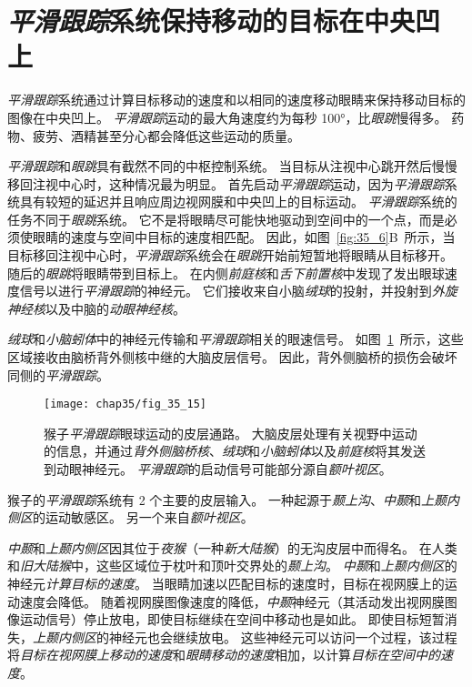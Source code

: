 \section{\textit{平滑跟踪}系统保持移动的目标在中央凹上}

\textit{平滑跟踪}系统通过计算目标移动的速度和以相同的速度移动眼睛来保持移动目标的图像在中央凹上。
\textit{平滑跟踪}运动的最大角速度约为每秒 100°，比\textit{眼跳}慢得多。
药物、疲劳、酒精甚至分心都会降低这些运动的质量。


\textit{平滑跟踪}和\textit{眼跳}具有截然不同的中枢控制系统。
当目标从注视中心跳开然后慢慢移回注视中心时，这种情况最为明显。
首先启动\textit{平滑跟踪}运动，因为\textit{平滑跟踪}系统具有较短的延迟并且响应周边视网膜和中央凹上的目标运动。
\textit{平滑跟踪}系统的任务不同于\textit{眼跳}系统。
它不是将眼睛尽可能快地驱动到空间中的一个点，而是必须使眼睛的速度与空间中目标的速度相匹配。
因此，如图~\ref{fig:35_6}B~所示，当目标移回注视中心时，\textit{平滑跟踪}系统会在\textit{眼跳}开始前短暂地将眼睛从目标移开。
随后的\textit{眼跳}将眼睛带到目标上。
在内侧\textit{前庭核}和\textit{舌下前置核}中发现了发出眼球速度信号以进行\textit{平滑跟踪}的神经元。
它们接收来自小脑\textit{绒球}的投射，并投射到\textit{外旋神经核}以及中脑的\textit{动眼神经核}。


\textit{绒球}和\textit{小脑蚓体}中的神经元传输和\textit{平滑跟踪}相关的眼速信号。
如图~\ref{fig:35_15}~所示，这些区域接收由脑桥背外侧核中继的大脑皮层信号。
因此，背外侧脑桥的损伤会破坏同侧的\textit{平滑跟踪}。


\begin{figure}[htbp]
	\centering
	\texttt{[image: chap35/fig\_35\_15]}
	\caption{猴子\textit{平滑跟踪}眼球运动的皮层通路。
		大脑皮层处理有关视野中运动的信息，并通过\textit{背外侧脑桥核}、\textit{绒球}和\textit{小脑蚓体}以及\textit{前庭核}将其发送到动眼神经元。
		\textit{平滑跟踪}的启动信号可能部分源自\textit{额叶视区}。}
	\label{fig:35_15}
\end{figure}


猴子的\textit{平滑跟踪}系统有 2 个主要的皮层输入。
一种起源于\textit{颞上沟}、\textit{中颞}和\textit{上颞内侧区}的运动敏感区。
另一个来自\textit{额叶视区}。


\textit{中颞}和\textit{上颞内侧区}因其位于\textit{夜猴}（一种\textit{新大陆猴}）的无沟皮层中而得名。
在人类和\textit{旧大陆猴}中，这些区域位于枕叶和顶叶交界处的\textit{颞上沟}。
\textit{中颞}和\textit{上颞内侧区}的神经元\textit{计算目标的速度}。
当眼睛加速以匹配目标的速度时，目标在视网膜上的运动速度会降低。
随着视网膜图像速度的降低，\textit{中颞}神经元（其活动发出视网膜图像运动信号）停止放电，即使目标继续在空间中移动也是如此。
即使目标短暂消失，\textit{上颞内侧区}的神经元也会继续放电。
这些神经元可以访问一个过程，该过程将\textit{目标在视网膜上移动的速度}和\textit{眼睛移动的速度}相加，以计算\textit{目标在空间中的速度}。



